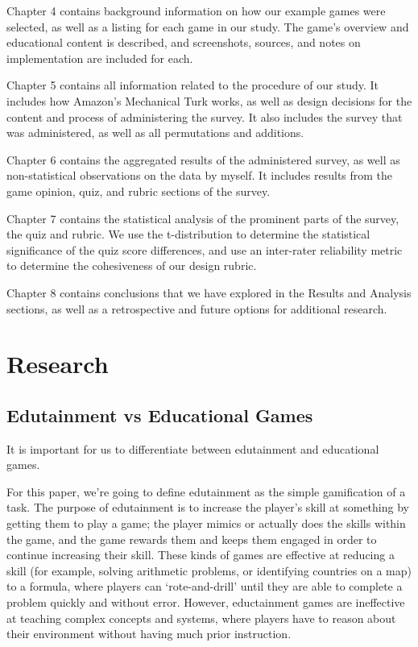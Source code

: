 \documentclass[12pt]{report}
\begin{document}
		Chapter 4 contains background information on how our example games were selected, as well as a listing for each game in our study. The game's overview and educational content is described, and screenshots, sources, and notes on implementation are included for each.

		Chapter 5 contains all information related to the procedure of our study. It includes how Amazon's Mechanical Turk works, as well as design decisions for the content and process of administering the survey. It also includes the survey that was administered, as well as all permutations and additions.

		Chapter 6 contains the aggregated results of the administered survey, as well as non-statistical observations on the data by myself. It includes results from the game opinion, quiz, and rubric sections of the survey.

		Chapter 7 contains the statistical analysis of the prominent parts of the survey, the quiz and rubric. We use the t-distribution to determine the statistical significance of the quiz score differences, and use an inter-rater reliability metric to determine the cohesiveness of our design rubric.

		Chapter 8 contains conclusions that we have explored in the Results and Analysis sections, as well as a retrospective and future options for additional research.

\chapter{Research}
	\section{Edutainment vs Educational Games}

		It is important for us to differentiate between edutainment and educational games. 

		For this paper, we're going to define edutainment as the simple gamification of a task. The purpose of edutainment is to increase the player's skill at something by getting them to play a game; the player mimics or actually does the skills within the game, and the game rewards them and keeps them engaged in order to continue increasing their skill. These kinds of games are effective at reducing a skill (for example, solving arithmetic problems, or identifying countries on a map) to a formula, where players can `rote-and-drill' until they are able to complete a problem quickly and without error. However, eductainment games are ineffective at teaching complex concepts and systems, where players have to reason about their environment without having much prior instruction. 
\end{document}
